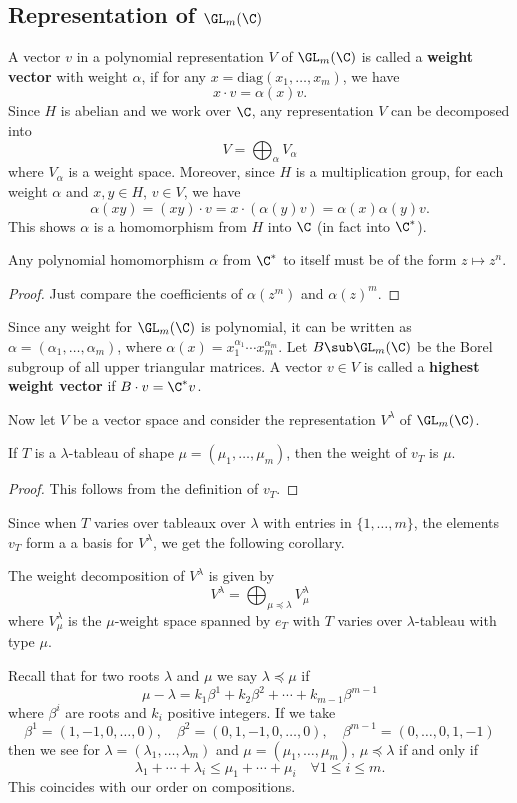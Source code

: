 \subsection{Representation of \boldmath\texorpdfstring{$\GL_m(\C)$}{G}}
A vector $v$ in a polynomial representation $V$ of $\GL_m(\C)$ is called a \textbf{weight vector} with weight $\alpha$, if for any $x=\mathrm{diag}(x_1,\dots,x_m)$, we have
\[x\cdot v=\alpha(x)v.\]
Since $H$ is abelian and we work over $\C$, any representation $V$ can be decomposed into
\[V=\bigoplus_\alpha V_\alpha\]
where $V_\alpha$ is a weight space. Moreover, since $H$ is a multiplication group, for each weight $\alpha$ and $x,y\in H$, $v\in V$, we have
\[\alpha(xy)=(xy)\cdot v=x\cdot(\alpha(y)v)=\alpha(x)\alpha(y)v.\]
This shows $\alpha$ is a homomorphism from $H$ into $\C$ (in fact into $\C^*$). 
\begin{lemma}
Any polynomial homomorphism $\alpha$ from $\C^{*}$ to itself must be of the form $z\mapsto z^n$.
\end{lemma}
\begin{proof}
Just compare the coefficients of $\alpha(z^m)$ and $\alpha(z)^m$.
\end{proof}
Since any weight for $\GL_m(\C)$ is polynomial, it can be written as $\alpha=(\alpha_1,\dots,\alpha_m)$, where $\alpha(x)=x_1^{\alpha_1}\cdots x_m^{\alpha_m}$. Let $B\sub\GL_m(\C)$ be the Borel subgroup of all upper triangular matrices. A vector $v\in V$ is called a \textbf{highest weight vector} if $B\cdot v=\C^*v$.\par
Now let $V$ be a vector space and consider the representation $V^\lambda$ of $\GL_m(\C)$.
\begin{proposition}
If $T$ is a $\lambda$-tableau of shape $\mu=(\mu_1,\dots,\mu_m)$, then the weight of $v_T$ is $\mu$.
\end{proposition}
\begin{proof}
This follows from the definition of $v_T$.
\end{proof}
Since when $T$ varies over tableaux over $\lambda$ with entries in $\{1,\dots,m\}$, the elements $v_T$ form a a basis for $V^\lambda$, we get the following corollary.
\begin{corollary}
The weight decomposition of $V^\lambda$ is given by
\[V^\lambda=\bigoplus_{\mu\preceq\lambda}V_\mu^\lambda\]
where $V_\mu^\lambda$ is the $\mu$-weight space spanned by $e_T$ with $T$ varies over $\lambda$-tableau with type $\mu$.
\end{corollary}
\begin{remark}
Recall that for two roots $\lambda$ and $\mu$ we say $\lambda\preceq\mu$ if
\[\mu-\lambda=k_1\beta^1+k_2\beta^2+\cdots+k_{m-1}\beta^{m-1}\]
where $\beta^i$ are roots and $k_i$ positive integers. If we take
\[\beta^1=(1,-1,0,\dots,0),\quad \beta^2=(0,1,-1,0,\dots,0),\quad \beta^{m-1}=(0,\dots,0,1,-1)\]
then we see for $\lambda=(\lambda_1,\dots,\lambda_m)$ and $\mu=(\mu_1,\dots,\mu_m)$, $\mu\preceq\lambda$ if and only if
\[\lambda_1+\cdots+\lambda_i\leq\mu_1+\cdots+\mu_i\quad\forall 1\leq i\leq m.\]
This coincides with our order on compositions.
\end{remark}
